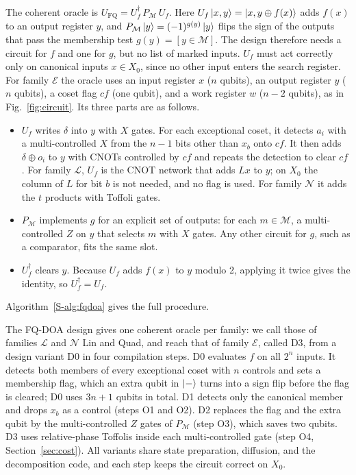 \documentclass[journal]{IEEEtran}
\newcommand{\Xo}{X_0}
\newcommand{\famE}{\mathcal{E}}
\newcommand{\famL}{\mathcal{L}}
\newcommand{\famN}{\mathcal{N}}
\begin{document}
The coherent oracle is $U_{\mathrm{FQ}}=U_f^{\dagger}\,P_{\mathcal{M}}\,U_f$.
Here $U_f\ket{x,y}=\ket{x,y\oplus f(x)}$ adds $f(x)$ to an output register $y$,
and $P_{\mathcal{M}}\ket{y}=(-1)^{g(y)}\ket{y}$ flips the sign of the outputs
that pass the membership test $g(y)=[y\in\mathcal{M}]$. The design therefore needs
a circuit for $f$ and one for $g$, but no list of marked inputs. $U_f$ must act correctly only
on canonical inputs $x\in\Xo$, since no other input enters the search register.
For family $\famE$ the oracle uses an input register $x$ ($n$ qubits), an output
register $y$ ($n$ qubits), a coset flag $\mathit{cf}$ (one qubit), and a work
register $w$ ($n-2$ qubits), as in Fig.~\ref{fig:circuit}. Its three parts are as
follows.
\begin{itemize}
\item $U_f$ writes $\delta$ into $y$ with $X$ gates. For each exceptional coset,
it detects $a_i$ with a multi-controlled $X$ from the $n-1$ bits other than
$x_b$ onto $\mathit{cf}$. It then adds $\delta\oplus o_i$ to $y$ with CNOTs
controlled by $\mathit{cf}$ and repeats the detection to clear $\mathit{cf}$.
For family $\famL$, $U_f$ is the CNOT network that adds $Lx$ to $y$; on $\Xo$
the column of $L$ for bit $b$ is not needed, and no flag is used. For family
$\famN$ it adds the $t$ products with Toffoli gates.
\item $P_{\mathcal{M}}$ implements $g$ for an explicit set of outputs: for each
$m\in\mathcal{M}$, a multi-controlled $Z$ on $y$ that selects $m$ with $X$
gates. Any other circuit for $g$, such as a comparator, fits the same slot.
\item $U_f^{\dagger}$ clears $y$. Because $U_f$ adds $f(x)$ to $y$ modulo 2,
applying it twice gives the identity, so $U_f^{\dagger}=U_f$.
\end{itemize}
Algorithm~\ref{S-alg:fqdoa} gives the full procedure.

The FQ-DOA design gives one coherent oracle per family: we call those of families
$\famL$ and $\famN$ Lin and Quad, and reach that of family $\famE$, called D3, from
a design variant D0 in four compilation steps. D0 evaluates $f$ on all $2^n$ inputs. It detects
both members of every exceptional coset with $n$ controls and sets a membership
flag, which an extra qubit in $\ket{-}$ turns into a sign flip before the flag is
cleared; D0 uses $3n+1$ qubits in total. D1 detects only the canonical member and
drops $x_b$ as a control (steps O1 and O2). D2 replaces the flag and the extra
qubit by the multi-controlled $Z$ gates of $P_{\mathcal{M}}$ (step O3), which
saves two qubits. D3 uses relative-phase Toffolis inside each multi-controlled
gate (step O4, Section~\ref{sec:cost}). All variants share state preparation,
diffusion, and the decomposition code, and each step keeps the circuit correct on
$\Xo$.
\end{document}

